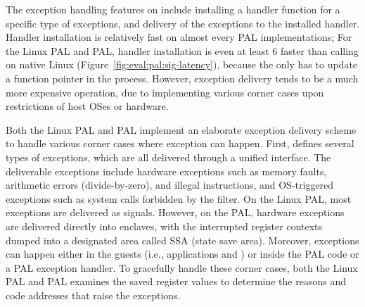 



The exception handling features on \thehostabi{}
include installing a handler function
for a specific type of exceptions,
and delivery of the exceptions to the installed handler.
Handler installation
is relatively fast on almost every PAL implementations;
For the Linux PAL and \sgx{} PAL,
handler installation
is even at least 6\x{} faster than calling  on native Linux (Figure~\ref{fig:eval:pal:sig-latency}),
because the \hostapi{} only has to update a function pointer in the process.
However, exception delivery
tends to be a much more expensive operation,
due to implementing various corner cases
upon restrictions
of host OSes or hardware.




Both the Linux PAL and \sgx{} PAL implement
an elaborate exception delivery scheme
to handle various corner cases where exception can happen.
First, \thehostabi{}
defines several types of exceptions,
which are all delivered through a unified interface.
The deliverable exceptions
include hardware exceptions such as memory faults,
arithmetic errors (divide-by-zero), and illegal instructions,
and OS-triggered exceptions
such as system calls forbidden by the \seccomp{} filter.
On the Linux PAL,
most exceptions are delivered as signals.
However, on the \sgx{} PAL,
hardware exceptions are delivered directly into enclaves,
with the interrupted register contexts dumped
into a designated area called SSA (state save area).
Moreover, exceptions can happen
either in the guests (i.e., applications and \liboses{})
or inside the PAL code or a PAL exception handler.
To gracefully handle these corner cases,
both the Linux PAL and \sgx{} PAL examines the saved register values to determine the reasons and code addresses
that raise the exceptions.



